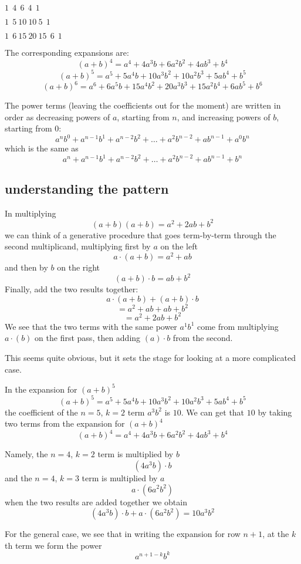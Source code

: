 \documentclass[11pt, oneside]{article}
\begin{document}
$1 \ \ 4 \ \ 6 \ \ 4 \ \ 1$

$1 \ \ 5 \ 10 \ 10 \ 5 \ \ 1$

$1 \ \ 6 \ 15 \ 20 \ 15 \ \ 6 \ \ 1$

The corresponding expansions are:
\[ (a+b)^4 = a^4 + 4a^3b + 6a^2b^2 + 4ab^3 + b^4 \]
\[ (a+b)^5 = a^5 + 5a^4b + 10a^3b^2 + 10a^2b^3 + 5ab^4 + b^5 \]
\[ (a+b)^6 = a^6 + 6a^5b + 15a^4b^2 + 20a^3b^3 + 15a^2b^4 + 6ab^5 + b^6 \]

The power terms (leaving the coefficients out for the moment) are written in order as decreasing powers of $a$, starting from $n$, and increasing powers of $b$, starting from $0$:
\[ a^nb^0 + a^{n-1}b^1 + a^{n-2}b^2 + \dots + a^2b^{n-2} + ab^{n-1} + a^0b^n \]
which is the same as
\[ a^n + a^{n-1}b^1 + a^{n-2}b^2 + \dots + a^2b^{n-2} + ab^{n-1} + b^n \]

\subsection*{understanding the pattern}
In multiplying
\[ (a + b)(a + b) = a^2 + 2ab + b^2 \]
we can think of a generative procedure that goes term-by-term through the second multiplicand, multiplying first by $a$ on the left
\[ a \cdot (a + b) = a^2 + ab \]
and then by $b$ on the right
\[ (a + b) \cdot b = ab + b^2 \]
Finally, add the two results together:
\[ a \cdot (a + b) + (a + b) \cdot b \]
\[ = a^2 + ab + ab + b^2 \]
\[ = a^2 + 2ab + b^2 \]
We see that the two terms with the same power $a^1b^1$ come from multiplying $a \cdot (b)$ on the first pass, then adding $(a) \cdot b$ from the second.

This seems quite obvious, but it sets the stage for looking at a more complicated case.

In the expansion for $(a+b)^5$
\[ (a+b)^5 = a^5 + 5a^4b + 10a^3b^2 + 10a^2b^3 + 5ab^4 + b^5 \]
the coefficient of the $n=5$, $k=2$ term $a^3b^2$ is $10$.  We can get that $10$ by taking two terms from the expansion for $(a+b)^4$
\[ (a+b)^4 = a^4 + 4a^3b + 6a^2b^2 + 4ab^3 + b^4 \]

Namely, the $n=4$, $k = 2$ term is multiplied by $b$
\[ (4a^3b) \cdot b \]
and the $n=4$, $k=3$ term is multiplied by $a$
\[ a \cdot (6a^2b^2)  \]
when the two results are added together we obtain
\[ (4a^3b) \cdot b + a \cdot (6a^2b^2) = 10a^3b^2 \]

For the general case, we see that in writing the expansion for row $n+1$, at the $k$th term we form the power
\[ a^{n+1-k}b^{k} \] 
\end{document}
